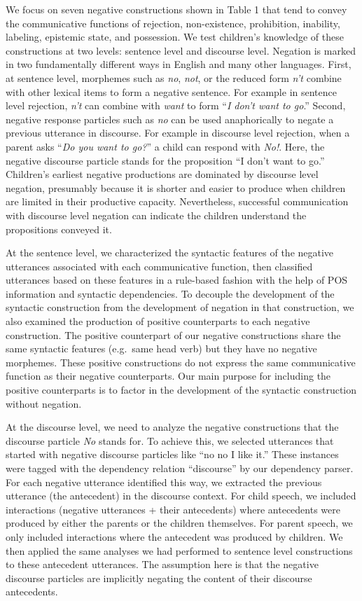 \documentclass[
  english,
  man,floatsintext]{apa6}
\begin{document}
We focus on seven negative constructions shown in Table 1 that tend to convey the communicative functions of rejection, non-existence, prohibition, inability, labeling, epistemic state, and possession. We test children's knowledge of these constructions at two levels: sentence level and discourse level. Negation is marked in two fundamentally different ways in English and many other languages. First, at sentence level, morphemes such as \emph{no}, \emph{not}, or the reduced form \emph{n't} combine with other lexical items to form a negative sentence. For example in sentence level rejection, \emph{n't} can combine with \emph{want} to form ``\emph{I don't want to go}.'' Second, negative response particles such as \emph{no} can be used anaphorically to negate a previous utterance in discourse. For example in discourse level rejection, when a parent asks ``\emph{Do you want to go?}'' a child can respond with \emph{No!}. Here, the negative discourse particle stands for the proposition ``I don't want to go.'' Children's earliest negative productions are dominated by discourse level negation, presumably because it is shorter and easier to produce when children are limited in their productive capacity. Nevertheless, successful communication with discourse level negation can indicate the children understand the propositions conveyed it.

At the sentence level, we characterized the syntactic features of the negative utterances associated with each communicative function, then classified utterances based on these features in a rule-based fashion with the help of POS information and syntactic dependencies. To decouple the development of the syntactic construction from the development of negation in that construction, we also examined the production of positive counterparts to each negative construction. The positive counterpart of our negative constructions share the same syntactic features (e.g.~same head verb) but they have no negative morphemes. These positive constructions do not express the same communicative function as their negative counterparts. Our main purpose for including the positive counterparts is to factor in the development of the syntactic construction without negation.

At the discourse level, we need to analyze the negative constructions that the discourse particle \emph{No} stands for. To achieve this, we selected utterances that started with negative discourse particles like ``no no I like it.'' These instances were tagged with the dependency relation ``discourse'' by our dependency parser. For each negative utterance identified this way, we extracted the previous utterance (the antecedent) in the discourse context. For child speech, we included interactions (negative utterances + their antecedents) where antecedents were produced by either the parents or the children themselves. For parent speech, we only included interactions where the antecedent was produced by children. We then applied the same analyses we had performed to sentence level constructions to these antecedent utterances. The assumption here is that the negative discourse particles are implicitly negating the content of their discourse antecedents.
\end{document}
